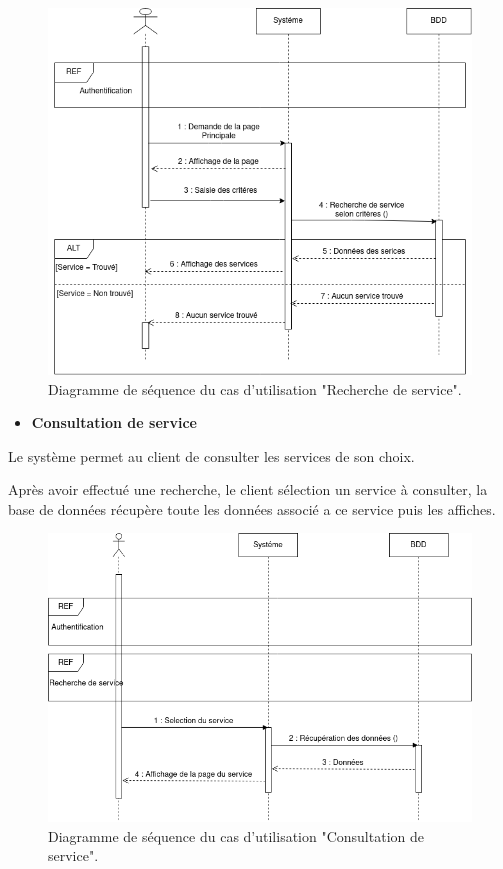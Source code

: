 \documentclass[french]{report}
\begin{document}
    \begin{figure}[H]
            \centering
            \includegraphics[width=1\textwidth]{images/Seq Diag Recherche Services.drawio.png}
            \caption{Diagramme de séquence du cas d'utilisation "Recherche de service".}
            \label{Seq Diag Recherche service}
    \end{figure}
    
\begin{itemize}
\item \textbf{Consultation de service}
\end{itemize}
    Le système permet au client de consulter les services de son choix.
    
    Après avoir effectué une recherche, le client sélection un service à consulter,
    la base de données récupère toute les données associé a ce service puis les affiches.
        
    \begin{figure}[H]
            \centering
            \includegraphics[width=1\textwidth]{images/Seq Diag Consultation de service.png}
            \caption{Diagramme de séquence du cas d'utilisation "Consultation de service".}
            \label{Seq Diag Consultation de service}
    \end{figure}
    
\end{document}
